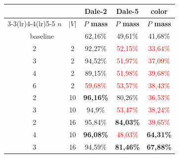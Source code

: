 \documentclass[11pt]{article}
\begin{document}
\begin{table}[ht!]
  \footnotesize
  \centering
  \begin{tabular}{cc|c|c|c}
    \toprule
                                  &           & \multicolumn{1}{c}{\textbf{Dale-2}} & \multicolumn{1}{c}{\textbf{Dale-5}} & \multicolumn{1}{c}{\textbf{color}} \\  \cmidrule(lr){3-3}\cmidrule(lr){4-4}\cmidrule(lr){5-5}
    $n$                           & $|V|$     & \textbf{$P$ mass}                   & \textbf{$P$ mass}                   & \textbf{$P$ mass}                  \\\midrule
    \multicolumn{2}{c|}{baseline} & {62,16\%} & {49,61\%}                           & {41,68\%}                                                                \\\midrule
    {2}                           & {2}       & {92,27\%}                           & \textcolor{red}{52,15\%}            & \textcolor{red}{33,64\%}           \\
    {3}                           & {2}       & {94,52\%}                           & \textcolor{red}{51,97\%}            & \textcolor{red}{37,09\%}           \\
    {4}                           & {2}       & {89,15\%}                           & \textcolor{red}{51,98\%}            & \textcolor{red}{39,68\%}           \\
    {6}                           & {2}       & \textcolor{red}{59,68\%}            & \textcolor{red}{53,57\%}            & \textcolor{red}{38,43\%}           \\
    {2}                           & {10}      & \textbf{96,16\%}                    & {80,26\%}                           & \textcolor{red}{36,53\%}           \\
    {3}                           & {10}      & {94,9\%}                            & \textcolor{red}{53,47\%}            & \textcolor{red}{38,24\%}           \\
    {2}                           & {16}      & {95,84\%}                           & \textbf{84,03\%}                    & \textcolor{red}{39,65\%}           \\
    {4}                           & {10}      & \textbf{96,08\%}                    & \textcolor{red}{48,03\%}            & \textbf{64,31\%}                   \\
    {3}                           & {16}      & {94,59\%}                           & \textbf{81,46\%}                    & \textbf{67,88\%}                   \\

\end{tabular}
\end{table}
\end{document}
